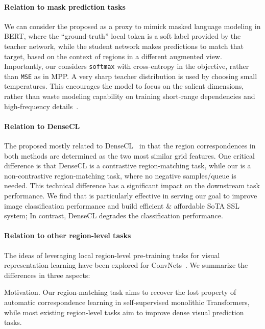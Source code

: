 \documentclass{article} \usepackage{iclr2022_conference,times}
\begin{document}
\paragraph{Relation to mask prediction tasks} We can consider the proposed  as a proxy to mimick masked language modeling in BERT, where the ``ground-truth'' local token is a soft label provided by the teacher network, while the student network makes predictions to match that target, based on the context of regions in a different augmented view. Importantly, our  considers \texttt{softmax} with cross-entropy in the objective, rather than \texttt{MSE} as in MPP. A very sharp teacher distribution is used by choosing small temperatures. This encourages the model to focus on the salient dimensions, rather than waste modeling capability on training short-range dependencies and high-frequency details~\citep{ramesh2021zero}.

\paragraph{Relation to DenseCL} The proposed  mostly related to DenseCL~\citep{wang2020dense} in that the region correspondences in both methods are determined as the two most similar grid features. One critical difference is that DenseCL is a contrastive region-matching task, while our  is a non-contrastive region-matching task, where no negative samples/queue is needed. This technical difference has a significant impact on the downstream task performance. We find that  is particularly effective in serving our goal to improve image classification performance and build efficient \& affordable SoTA SSL system; In contrast, DenseCL degrades the classification performance. 

\paragraph{Relation to other region-level tasks} The ideas of leveraging local region-level pre-training tasks for visual representation learning have been explored for ConvNets~\citep{misra2020self,xiong2020loco,wang2020dense,xie2021detco,yang2021instance,xie2021propagate}. We summarize the differences in three aspects:

Motivation. Our region-matching task  aims to recover the lost property of automatic correspondence learning in self-supervised monolithic Transformers, while most existing region-level tasks aim to improve dense visual prediction tasks.
 
\end{document}
